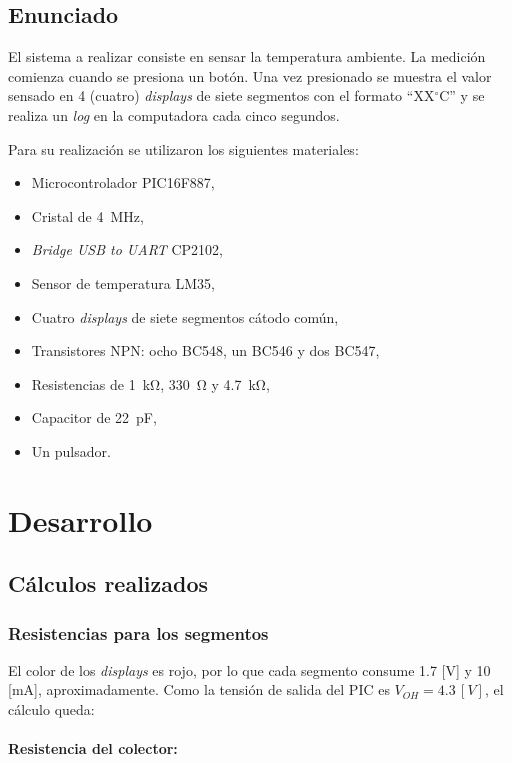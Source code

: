 \documentclass[12pt,a4paper]{article}
\begin{document}
\subsection{Enunciado}
	El sistema a realizar consiste en sensar la temperatura ambiente. La medición comienza cuando se presiona un botón. Una vez presionado se muestra el valor sensado en 4 (cuatro) \emph{displays} de siete segmentos con el formato ``XX$^{\circ}$C'' y se realiza un \emph{log} en la computadora cada cinco segundos.
	
	Para su realización se utilizaron los siguientes materiales:
	
	\begin{itemize}[leftmargin=1.5cm,nosep]
	\item Microcontrolador PIC16F887,
	\item Cristal de \SI{4}{\MHz},
	\item \emph{Bridge USB to UART} CP2102,
	\item Sensor de temperatura LM35,
	\item Cuatro \emph{displays} de siete segmentos cátodo común,
	\item Transistores NPN: ocho BC548, un BC546 y dos BC547,
	\item Resistencias de \SI{1}{\kilo\ohm}, \SI{330}{\ohm} y \SI{4,7}{\kilo\ohm},
	\item Capacitor de \SI{22}{\pico\F},
	\item Un pulsador.
	\end{itemize}

\section{Desarrollo}
		
\subsection{Cálculos realizados}

\subsubsection{Resistencias para los segmentos}
	El color de los \emph{displays} es rojo, por lo que cada segmento consume 1.7 [V] y 10 [mA], aproximadamente. Como la tensión de salida del PIC es $V_{OH} = 4.3\,[V]$, el cálculo queda:
	
\paragraph{Resistencia del colector:}
	
\end{document}
